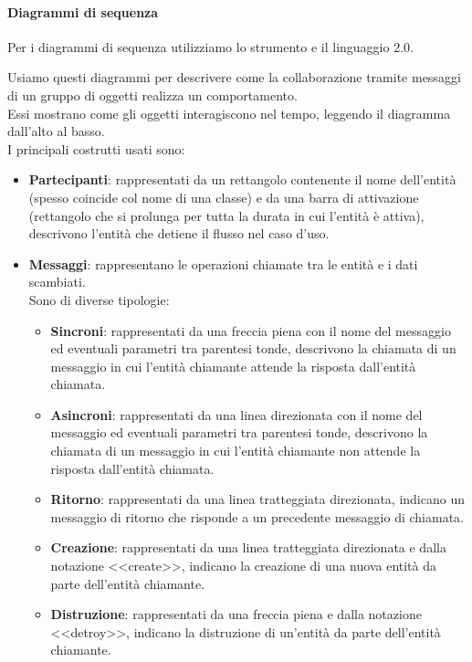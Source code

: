 		\paragraph{Diagrammi di sequenza}\label{PP:Sviluppo:DiagrammiSequenza}
		Per i diagrammi di sequenza utilizziamo lo strumento  e il linguaggio  2.0.\par
        Usiamo questi diagrammi per descrivere come la collaborazione tramite messaggi di un gruppo di oggetti realizza un comportamento.\\
        Essi mostrano come gli oggetti interagiscono nel tempo, leggendo il diagramma dall'alto al basso.\\
        I principali costrutti usati sono:
        \begin{itemize}
            \item \textbf{Partecipanti}: rappresentati da un rettangolo contenente il nome dell'entità (spesso coincide col nome di una classe) e da una barra di attivazione (rettangolo che si prolunga per tutta la durata in cui l'entità è attiva), descrivono l'entità che detiene il flusso nel caso d'uso.
            \item \textbf{Messaggi}: rappresentano le operazioni chiamate tra le entità e i dati scambiati.\\
            Sono di diverse tipologie:
            \begin{itemize}
                \item \textbf{Sincroni}: rappresentati da una freccia piena con il nome del messaggio ed eventuali parametri tra parentesi tonde, descrivono la chiamata di un messaggio in cui l'entità chiamante attende la risposta dall'entità chiamata.
                \item \textbf{Asincroni}: rappresentati da una linea direzionata con il nome del messaggio ed eventuali parametri tra parentesi tonde, descrivono la chiamata di un messaggio in cui l'entità chiamante non attende la risposta dall'entità chiamata.
                \item \textbf{Ritorno}: rappresentati da una linea tratteggiata direzionata, indicano un messaggio di ritorno che risponde a un precedente messaggio di chiamata.
                \item \textbf{Creazione}: rappresentati da una linea tratteggiata direzionata e dalla notazione <<create>>, indicano la creazione di una nuova entità da parte dell'entità chiamante.
                \item \textbf{Distruzione}: rappresentati da una freccia piena e dalla notazione <<detroy>>, indicano la distruzione di un'entità da parte dell'entità chiamante.
            \end{itemize}
        \end{itemize}

